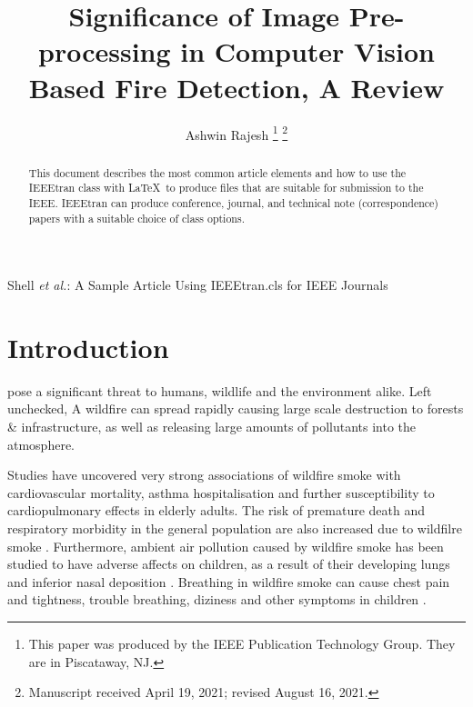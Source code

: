 \documentclass[lettersize,journal]{IEEEtran}
\begin{document}
\title{Significance of Image Pre-processing in Computer Vision Based Fire Detection, A Review}

\author{Ashwin Rajesh
\thanks{This paper was produced by the IEEE Publication Technology Group. They are in Piscataway, NJ.}%
\thanks{Manuscript received April 19, 2021; revised August 16, 2021.}}

%
{Shell \MakeLowercase{\textit{et al.}}: A Sample Article Using IEEEtran.cls for IEEE Journals}


\maketitle

\begin{abstract}
        This document describes the most common article elements and how to use the IEEEtran class with \LaTeX \ to produce files that are suitable for submission to the IEEE.  IEEEtran can produce conference, journal, and technical note (correspondence) papers with a suitable choice of class options. 
\end{abstract}


\section{Introduction}
 pose a significant threat to humans, wildlife and the
environment alike. Left unchecked, A wildfire can spread rapidly causing
large scale destruction to forests \& infrastructure, as well as
releasing large amounts of pollutants into the atmosphere.

Studies have uncovered very strong associations of wildfire smoke with cardiovascular mortality, asthma hospitalisation and further susceptibility to cardiopulmonary effects in elderly adults.
The risk of premature death and respiratory morbidity in the general population are also increased due to wildfilre smoke \cite{wildfirehealth}.
Furthermore, ambient air pollution caused by wildfire smoke has been studied to have adverse affects on children, as a result of their developing lungs and inferior nasal deposition \cite{wildfirechildren}.
Breathing in wildfire smoke can cause chest pain and tightness, trouble breathing, diziness and other symptoms in children \cite{wildfirefactsheet}.
\end{document}
